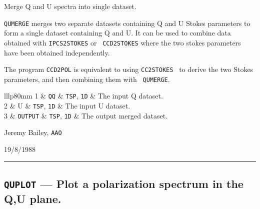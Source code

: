 \documentclass[11pt,twoside]{article}
\makeatletter
\renewcommand{\_}{\texttt{\symbol{95}}}
\newcommand{\manrule}{\rule{\textwidth}{0.5mm}}
\newcommand{\manroutine}[3]{\subsection{#1 --- #2}}
\newenvironment{manroutinedescription}{\begin{description}}{\end{description}%
\manrule}
\newcommand{\manroutineitem}[2]{\item[#1:] #2\mbox{}}
\newcommand{\manparametercols}{lllp{80mm}}
\newcommand{\manparameterorder}[3]{#1 & #2 & #3 & }
\newcommand{\manparametertop}{}
\newcommand{\manparameterbottom}{}
\newenvironment{manparametertable}{\gdef\manparameter@ss{}%
\gdef\manparameter@hl{}\hspace*{\fill}\vspace*{-\partopsep}\begin{trivlist}%
\item[]\begin{tabular}{\manparametercols}\manparametertop}{\manparameterbottom%
\end{tabular}\end{trivlist}}
\newcommand{\manparameterentry}[3]{\manparameter@ss\gdef\manparameter@ss{\\}%
\gdef\manparameter@hl{\hline}\manparameterorder{#1}{#2}{#3}}
\newcommand{\mantt}{\tt}
\makeatother
\begin{document}
\begin{manroutinedescription}
\manroutineitem{Function}{}
        Merge Q and U spectra into single dataset.

\manroutineitem{Description}{}
        {\mantt{QUMERGE}} merges two separate datasets containing Q and U Stokes
        parameters to form a single dataset containing Q and U. It can
        be used to combine data obtained with {\mantt{IPCS2STOKES}} or {\mantt{%
CCD2STOKES}}
        where the two stokes parameters have been obtained independently.

        The program {\mantt{CCD2POL}} is equivalent to using {\mantt{CC2STOKES}%
} to derive
        the two Stokes parameters, and then combining them with {\mantt{%
QUMERGE}}.

\manroutineitem{Parameters}{}
\begin{manparametertable}
\manparameterentry{1}{{\mantt{QQ}}}{{\mantt{TSP}}, {\mantt{1D}}}  The input Q %
dataset.
\manparameterentry{2}{U}{{\mantt{TSP}}, {\mantt{1D}}}  The input U dataset.
\manparameterentry{3}{{\mantt{OUTPUT}}}{{\mantt{TSP}}, {\mantt{1D}}}  The %
output merged dataset.

\end{manparametertable}
\manroutineitem{Support}{}
         Jeremy Bailey, {\mantt{AAO}}

\manroutineitem{Version date}{}
         19/8/1988

\end{manroutinedescription}
\manroutine{{\mantt{QUPLOT}}}{Plot a polarization spectrum in the Q,U plane.}{%
QUPLOT}
\end{document}
